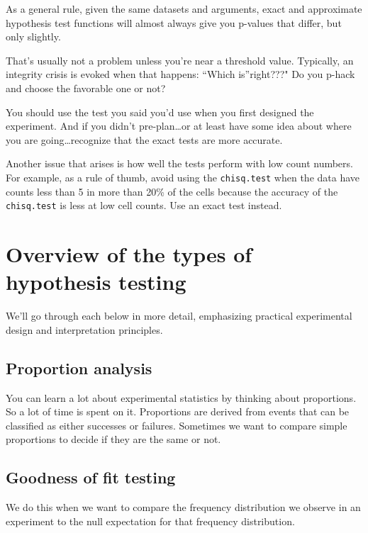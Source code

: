 \documentclass[]{book}
\begin{document}
As a general rule, given the same datasets and arguments, exact and approximate hypothesis test functions will almost always give you p-values that differ, but only slightly.

That's usually not a problem unless you're near a threshold value. Typically, an integrity crisis is evoked when that happens: ``Which is''right???" Do you p-hack and choose the favorable one or not?

You should use the test you said you'd use when you first designed the experiment. And if you didn't pre-plan\ldots{}or at least have some idea about where you are going\ldots{}recognize that the exact tests are more accurate.

Another issue that arises is how well the tests perform with low count numbers. For example, as a rule of thumb, avoid using the \texttt{chisq.test} when the data have counts less than 5 in more than 20\% of the cells because the accuracy of the \texttt{chisq.test} is less at low cell counts. Use an exact test instead.

\hypertarget{overview-of-the-types-of-hypothesis-testing}{%
\section{Overview of the types of hypothesis testing}\label{overview-of-the-types-of-hypothesis-testing}}

We'll go through each below in more detail, emphasizing practical experimental design and interpretation principles.

\hypertarget{proportion-analysis}{%
\subsection{Proportion analysis}\label{proportion-analysis}}

You can learn a lot about experimental statistics by thinking about proportions. So a lot of time is spent on it. Proportions are derived from events that can be classified as either successes or failures. Sometimes we want to compare simple proportions to decide if they are the same or not.

\hypertarget{goodness-of-fit-testing}{%
\subsection{Goodness of fit testing}\label{goodness-of-fit-testing}}

We do this when we want to compare the frequency distribution we observe in an experiment to the null expectation for that frequency distribution.
\end{document}
